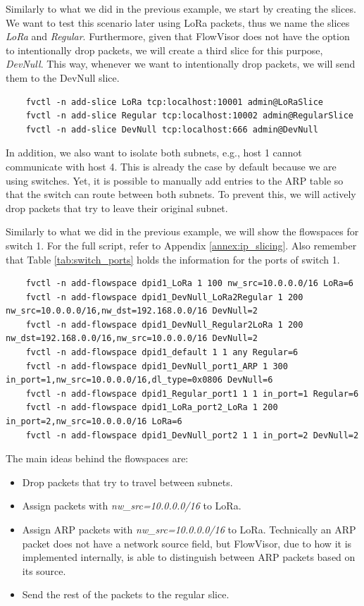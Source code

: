 Similarly to what we did in the previous example, we start by creating the slices. We want to test this scenario later using LoRa packets, thus we name the slices \textit{LoRa} and \textit{Regular}. Furthermore, given that FlowVisor does not have the option to intentionally drop packets, we will create a third slice for this purpose, \textit{DevNull}. This way, whenever we want to intentionally drop packets, we will send them to the DevNull slice. 
\begin{lstlisting}
    fvctl -n add-slice LoRa tcp:localhost:10001 admin@LoRaSlice
    fvctl -n add-slice Regular tcp:localhost:10002 admin@RegularSlice
    fvctl -n add-slice DevNull tcp:localhost:666 admin@DevNull
\end{lstlisting}

In addition, we also want to isolate both subnets, e.g., host 1 cannot communicate with host 4. This is already the case by default because we are using switches. Yet, it is possible to manually add entries to the ARP table so that the switch can route between both subnets. To prevent this, we will actively drop packets that try to leave their original subnet.

Similarly to what we did in the previous example, we will show the flowspaces for switch 1. For the full script, refer to Appendix \ref{annex:ip_slicing}. Also remember that Table \ref{tab:switch_ports} holds the information for the ports of switch 1.
\begin{lstlisting}
    fvctl -n add-flowspace dpid1_LoRa 1 100 nw_src=10.0.0.0/16 LoRa=6
    fvctl -n add-flowspace dpid1_DevNull_LoRa2Regular 1 200 nw_src=10.0.0.0/16,nw_dst=192.168.0.0/16 DevNull=2
    fvctl -n add-flowspace dpid1_DevNull_Regular2LoRa 1 200 nw_dst=192.168.0.0/16,nw_src=10.0.0.0/16 DevNull=2
    fvctl -n add-flowspace dpid1_default 1 1 any Regular=6
    fvctl -n add-flowspace dpid1_DevNull_port1_ARP 1 300 in_port=1,nw_src=10.0.0.0/16,dl_type=0x0806 DevNull=6
    fvctl -n add-flowspace dpid1_Regular_port1 1 1 in_port=1 Regular=6
    fvctl -n add-flowspace dpid1_LoRa_port2_LoRa 1 200 in_port=2,nw_src=10.0.0.0/16 LoRa=6
    fvctl -n add-flowspace dpid1_DevNull_port2 1 1 in_port=2 DevNull=2
\end{lstlisting}

The main ideas behind the flowspaces are:
\begin{itemize}
    \item Drop packets that try to travel between subnets.
    \item Assign packets with \textit{nw\_src=10.0.0.0/16} to LoRa.
    \item Assign ARP packets with \textit{nw\_src=10.0.0.0/16} to LoRa. Technically an ARP packet does not have a network source field, but FlowVisor, due to how it is implemented internally, is able to distinguish between ARP packets based on its source.
    \item Send the rest of the packets to the regular slice.
\end{itemize}

